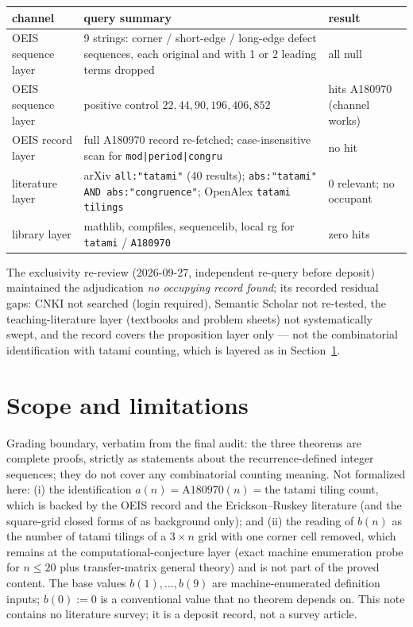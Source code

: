 \documentclass[11pt]{article}
\begin{document}
\begin{center}
\begin{tabular}{p{}p{}p{}}
\hline
channel & query summary & result \\
\hline
OEIS sequence layer & 9 strings: corner / short-edge / long-edge defect
sequences, each original and with 1 or 2 leading terms dropped & all null \\
OEIS sequence layer & positive control $22, 44, 90, 196, 406, 852$ &
hits A180970 (channel works) \\
OEIS record layer & full A180970 record re-fetched; case-insensitive scan
for \texttt{mod|period|congru} & no hit \\
literature layer & arXiv \texttt{all:"tatami"} (40 results);
\texttt{abs:"tatami" AND abs:"congruence"}; OpenAlex \texttt{tatami tilings}
& 0 relevant; no occupant \\
library layer & mathlib, compfiles, sequencelib, local rg for
\texttt{tatami} / \texttt{A180970} & zero hits \\
\hline
\end{tabular}
\end{center}

The exclusivity re-review (2026-09-27, independent re-query before deposit)
maintained the adjudication \emph{no occupying record found}; its recorded
residual gaps: CNKI not searched (login required), Semantic Scholar not
re-tested, the teaching-literature layer (textbooks and problem sheets) not
systematically swept, and the record covers the proposition layer only --- not
the combinatorial identification with tatami counting, which is layered as in
Section~\ref{sec:scope}.

\section{Scope and limitations}\label{sec:scope}

Grading boundary, verbatim from the final audit: the three theorems are
complete proofs, strictly as statements about the recurrence-defined integer
sequences; they do not cover any combinatorial counting meaning. Not
formalized here: (i) the identification $a(n) = \text{A180970}(n) = {}$the
tatami tiling count, which is backed by the OEIS record and the
Erickson--Ruskey literature \cite{oeis-a180970,auspicious,ejc-monodimer}
(and the square-grid closed forms of \cite{square-tatami} as background
only); and (ii) the reading of $b(n)$ as the number of tatami tilings of a
$3 \times n$ grid with one corner cell removed, which remains at the
computational-conjecture layer (exact machine enumeration probe for
$n \leq 20$ plus transfer-matrix general theory) and is not part of the
proved content. The base values $b(1), \dots, b(9)$ are machine-enumerated
definition inputs; $b(0) := 0$ is a conventional value that no theorem
depends on. This note contains no literature survey; it is a deposit record,
not a survey article.
\end{document}
